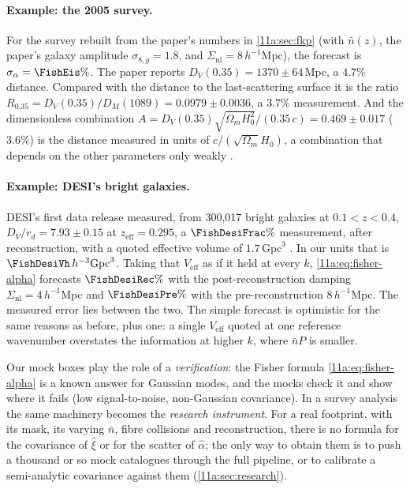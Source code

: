 \paragraph{Example: the 2005 survey.}
For the survey rebuilt from the paper's numbers in \cref{11a:sec:fkp} (with
$\bar n(z)$, the paper's galaxy amplitude $\sigma_{8,g}=1.8$, and
$\Sigma_{\mathrm{nl}}=8\,h^{-1}$Mpc), the forecast is $\sigma_\alpha=\FishEis\%$.
The paper reports $D_V(0.35)=1370\pm64$\,Mpc, a $4.7\%$ distance. Compared with
the distance to the last-scattering surface it is the ratio
$R_{0.35}=D_V(0.35)/D_M(1089)=0.0979\pm0.0036$, a $3.7\%$ measurement. And the
dimensionless combination $A=D_V(0.35)\sqrt{\Omega_mH_0^2}/(0.35\,c)=0.469\pm0.017$
($3.6\%$) is the distance measured in units of $c/(\sqrt{\Omega_m}H_0)$, a combination
that depends on the other parameters only weakly .

\paragraph{Example: DESI's bright galaxies.}
DESI's first data release measured, from 300,017 bright galaxies at
$0.1<z<0.4$, $D_V/r_d=7.93\pm0.15$ at $z_{\mathrm{eff}}=0.295$, a $\FishDesiFrac\%$
measurement, after reconstruction, with a quoted effective volume of
$1.7\,\mathrm{Gpc}^3$ . In our units that is
$\FishDesiVh\,h^{-3}\mathrm{Gpc}^3$. Taking that $V_{\mathrm{eff}}$ as if it held at
every $k$, \eqref{11a:eq:fisher-alpha} forecasts $\FishDesiRec\%$ with the
post-reconstruction damping $\Sigma_{\mathrm{nl}}=4\,h^{-1}$Mpc and $\FishDesiPre\%$
with the pre-reconstruction $8\,h^{-1}$Mpc. The measured error lies between the two.
The simple forecast is optimistic for the same reasons as before, plus one: a
single $V_{\mathrm{eff}}$ quoted at one reference wavenumber overstates the
information at higher $k$, where $\bar nP$ is smaller.

\begin{inpractice}
Our mock boxes play the role of a \emph{verification}: the Fisher formula
\eqref{11a:eq:fisher-alpha} is a known answer for Gaussian modes, and the mocks
check it and show where it fails (low signal-to-noise, non-Gaussian covariance).
In a survey analysis the same machinery becomes the \emph{research instrument}.
For a real footprint, with its mask, its varying $\bar n$, fibre collisions and
reconstruction, there is no formula for the covariance of $\hat\xi$ or for the
scatter of $\hat\alpha$; the only way to obtain them is to push a thousand or so
mock catalogues through the full pipeline, or to calibrate a semi-analytic
covariance against them (\cref{11a:sec:research}).
\end{inpractice}

